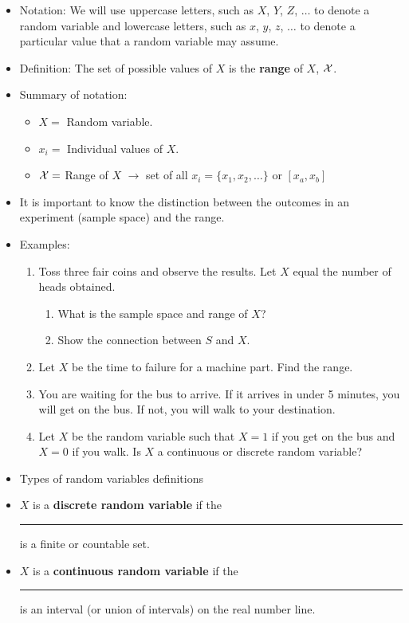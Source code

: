 \documentclass{article}
\newcommand{\blankul}[1]{\rule[-1.5mm]{#1}{0.15mm}}	%
\newcommand{\vecinf}[1]{#1_1, #1_{2}, \ldots}		%
\begin{document}
\begin{itemize}
    \item Notation: We will use uppercase letters, such as $X$, $Y$, $Z$, $\ldots$ to denote a random variable and lowercase letters, such as $x$, $y$, $z$, $\ldots$ to denote a particular value that a random variable may assume.\bigskip
    \item Definition: The set of possible values of $X$ is the \textbf{range} of $X$, ${\cal X}$.
    \item Summary of notation:
    \begin{itemize}
        \item $X = $ Random variable.
        \item $x_i = $ Individual values of $X$.
        \item ${\cal X} = $ Range of $X$ $\rightarrow$ set of all $x_i = \{\vecinf{x}\}$ or $[x_a, x_b]$
    \end{itemize}\bigskip
    \item It is important to know the distinction between the outcomes in an experiment (sample space) and the range.
    \item Examples:
    \begin{enumerate}
        \item Toss three fair coins and observe the results. Let $X$ equal the number of heads obtained.     
        \begin{enumerate}
            \item What is the sample space and range of $X$?\vspace{30pt}
            \item Show the connection between $S$ and $X$.\vspace{70pt}
        \end{enumerate}
        \item Let $X$ be the time to failure for a machine part. Find the range.\vspace{30pt}
        \item You are waiting for the bus to arrive. If it arrives in under 5 minutes, you will get on the bus. If not, you will walk to your destination.
    \item[] Let $X$ be the random variable such that $X = 1$ if you get on the bus and $X = 0$ if you walk. Is $X$ a continuous or discrete random variable?\vspace{70pt}
    \end{enumerate}
    \item Types of random variables definitions
    \item[] $X$ is a \textbf{discrete random variable} if the \blankul{2cm} is a finite or countable set.
    \item[] $X$ is a \textbf{continuous random variable} if the \blankul{2cm} is an interval (or union of intervals) on the real number line.
\end{itemize}\bigskip
\end{document}

